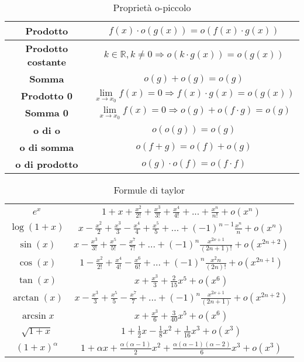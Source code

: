 \begin{table}[h!]
	\centering
	\setlength{\tabcolsep}{10pt}
	\renewcommand{\arraystretch}{2.5}
	\begin{tabular}{|c|c|}
		\hline
		\textbf{Prodotto} & $f(x) \cdot o(g(x)) = o(f(x) \cdot g(x))$\\
		\hline
		\textbf{Prodotto costante} & $k \in \mathbb{R}, k \neq 0 \Longrightarrow o(k \cdot g(x)) = o(g(x))$\\
		\hline
		\textbf{Somma} & $o(g) + o(g) = o(g)$ \\
		\hline
		\textbf{Prodotto 0} & $\lim\limits_{x\to x_0}f(x) = 0 \Longrightarrow f(x) \cdot g(x) = o(g(x))$ \\
		\hline
		\textbf{Somma 0} & $\lim\limits_{x\to x_0}f(x) = 0 \Longrightarrow o(g) + o(f \cdot g) = o(g)$ \\
		\hline
		\textbf{o di o} & $o(o(g)) = o(g)$ \\
		\hline
		\textbf{o di somma} & $o(f + g) = o(f) + o(g)$ \\
		\hline
		\textbf{o di prodotto} & $o(g) \cdot o(f) = o(f \cdot f)$ \\
		\hline
	\end{tabular}
	\caption{Proprietà o-piccolo}
\end{table}
\begin{table}[h!]
	\setlength{\tabcolsep}{5pt}
	\renewcommand{\arraystretch}{2.2}
	\centering
	\begin{tabular}{|c|c|}
		\hline
		$e^x$ & $1 + x + \frac{x^2}{2!} + \frac{x^3}{3!} + \frac{x^4}{4!} + ... + \frac{x^n}{n!} + o(x^n)$  \\
		$\log(1+x)$ & $x - \frac{x^2}{2} + \frac{x^3}{3} - \frac{x^4}{4} + \frac{x^5}{5} + ... + (-1)^{n-1}\frac{x^n}{n} + o(x^n)$ \\
		$\sin(x)$ & $x - \frac{x^3}{3!} + \frac{x^5}{5!} - \frac{x^7}{7!} + ... + (-1)^n \frac{x^{2x+1}}{(2n+1)!} + o(x^{2n+2})$ \\
		$\cos(x)$ & $1 - \frac{x^2}{2!} + \frac{x^4}{4!} - \frac{x^6}{6!} + ... + (-1)^n\frac{x^2n}{(2n)!} + o(x^{2n+1})$ \\
		$\tan(x)$ & $x + \frac{x^3}{3} + \frac{2}{15}x^5 + o(x^6)$\\
		$\arctan(x)$ & $x - \frac{x^3}{3} + \frac{x^5}{5} - \frac{x^7}{7} + ... + (-1)^n\frac{x^{2x+1}}{(2n + 1)} + o(x^{2n+2})$\\
		$\arcsin{x}$ & $x + \frac{x^3}{6} + \frac{3}{40}x^5 + o(x^6)$\\
		$\sqrt{1+x}$ & $1 + \frac{1}{2}x - \frac{1}{8}x^2 + \frac{1}{16}x^3 + o(x^3)$\\
		$(1+x)^{\alpha}$ & $1 + \alpha x + \frac{\alpha(\alpha - 1)}{2}x^2 + \frac{\alpha(\alpha - 1)(\alpha - 2)}{6}x^3 + o(x^3)$\\
		\hline
	\end{tabular}
	\caption{Formule di taylor}
\end{table}

